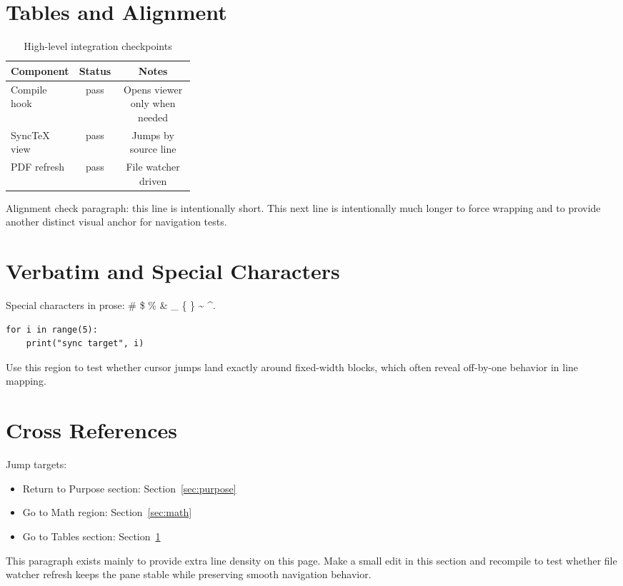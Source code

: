 \documentclass{article}
\begin{document}
\newpage
\section{Tables and Alignment}
\label{sec:tables}
\begin{table}[h]
\centering
\begin{tabular}{>{\raggedright\arraybackslash}p{0.3\linewidth}cc}
\toprule
Component & Status & Notes \\
\midrule
Compile hook & pass & Opens viewer only when needed \\
SyncTeX view & pass & Jumps by source line \\
PDF refresh & pass & File watcher driven \\
\bottomrule
\end{tabular}
\caption{High-level integration checkpoints}
\end{table}

Alignment check paragraph: this line is intentionally short.
This next line is intentionally much longer to force wrapping and to provide another
distinct visual anchor for navigation tests.

\newpage
\section{Verbatim and Special Characters}
\label{sec:verbatim}
Special characters in prose: \# \$ \% \& \_ \{ \} \textasciitilde{} \textasciicircum{}.

\begin{verbatim}
for i in range(5):
    print("sync target", i)
\end{verbatim}

Use this region to test whether cursor jumps land exactly around fixed-width blocks,
which often reveal off-by-one behavior in line mapping.

\newpage
\section{Cross References}
\label{sec:refs}
Jump targets:
\begin{itemize}
  \item Return to Purpose section: Section~\ref{sec:purpose}
  \item Go to Math region: Section~\ref{sec:math}
  \item Go to Tables section: Section~\ref{sec:tables}
\end{itemize}

This paragraph exists mainly to provide extra line density on this page.
Make a small edit in this section and recompile to test whether file watcher refresh
keeps the pane stable while preserving smooth navigation behavior.
\end{document}
